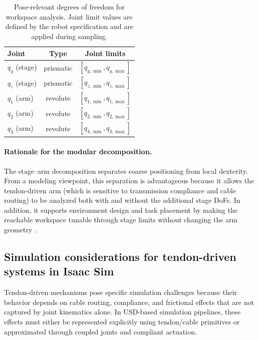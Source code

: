 \begin{table}[htb]
    \centering
    \caption{Pose-relevant degrees of freedom for workspace analysis. Joint limit values are defined by the robot specification and are applied during sampling.}\label{tab:robot_dofs}
    \begin{tabular}{l c c}
    \hline
    \textbf{Joint} & \textbf{Type} & \textbf{Joint limits} \\
    \hline
    $q_y$ (stage) & prismatic & $[q_{y,\min}, q_{y,\max}]$ \\
    $q_z$ (stage) & prismatic & $[q_{z,\min}, q_{z,\max}]$ \\
    $q_1$ (arm) & revolute & $[q_{1,\min}, q_{1,\max}]$ \\
    $q_2$ (arm) & revolute & $[q_{2,\min}, q_{2,\max}]$ \\
    $q_3$ (arm) & revolute & $[q_{3,\min}, q_{3,\max}]$ \\
    \hline
    \end{tabular}
\end{table}

\paragraph{Rationale for the modular decomposition.}
The stage--arm decomposition separates coarse positioning from local dexterity. From a modeling viewpoint, this separation is advantageous because it allows the tendon-driven arm (which is sensitive to transmission compliance and cable routing) to be analyzed both with and without the additional stage \acp{DoF}. In addition, it supports environment design and task placement by making the reachable workspace tunable through stage limits without changing the arm geometry~\cite{Klein2023}.

\subsection{Simulation considerations for tendon-driven systems in Isaac Sim}

Tendon-driven mechanisms pose specific simulation challenges because their behavior depends on cable routing, compliance, and frictional effects that are not captured by joint kinematics alone. In \ac{USD}-based simulation pipelines, these effects must either be represented explicitly using tendon/cable primitives or approximated through coupled joints and compliant actuation.

